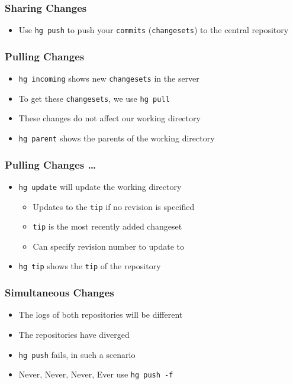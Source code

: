 \documentclass[14pt,compress]{beamer}
\newcommand{\typ}[1]{\lstinline{#1}}
\begin{document}
\begin{frame}
  \frametitle{Sharing Changes}
  \begin{itemize}
  \item Use \typ{hg push} to push your \typ{commits}
    (\typ{changesets}) to the central repository
  \end{itemize}
\end{frame}


\begin{frame}
  \frametitle{Pulling Changes}
  \begin{itemize}
  \item \typ{hg incoming} shows new \typ{changesets} in the server 
  \item To get these \typ{changesets}, we use \typ{hg pull}
  \item These changes do not affect our working directory
  \item \typ{hg parent} shows the parents of the working directory
  \end{itemize}
\end{frame}

\begin{frame}
  \frametitle{Pulling Changes \ldots}
  \begin{itemize}
  \item \typ{hg update} will update the working directory 
    \begin{itemize}
    \item Updates to the \typ{tip} if no revision is specified
    \item \typ{tip} is the most recently added changeset 
    \item Can specify revision number to update to
    \end{itemize}
  \item \typ{hg tip} shows the \typ{tip} of the repository
  \end{itemize}
\end{frame}

\begin{frame}
  \frametitle{Simultaneous Changes}
  \begin{itemize}
  \item The logs of both repositories will be different
  \item The repositories have diverged
  \item \typ{hg push} fails, in such a scenario
  \item \alert{Never, Never, Never, Ever} use \typ{hg push -f}
  \end{itemize}
\end{frame}
\end{document}
